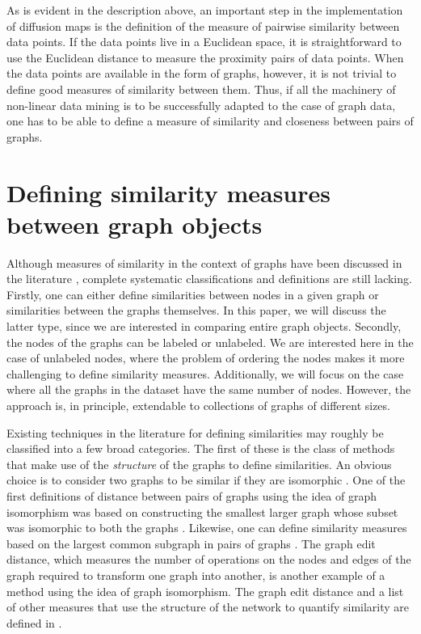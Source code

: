 As is evident in the description above, an important step in the
implementation of diffusion maps is the definition of the measure of
pairwise similarity between data points.
% 
If the data points live in a Euclidean space, it is straightforward to
use the Euclidean distance to measure the proximity pairs of data
points.
% 
When the data points are available in the form of graphs, however, it
is not trivial to define good measures of similarity between them.
% 
Thus, if all the machinery of non-linear data mining is to be
successfully adapted to the case of graph data, one has to be able to
define a measure of similarity and closeness between pairs of graphs.

\section{\label{sec:sim} Defining similarity measures between graph
  objects}

Although measures of similarity in the context of graphs have been
discussed in the literature \cite{koutra_algorithms_2011}, complete
systematic classifications and definitions are still lacking.
% 
Firstly, one can either define similarities between nodes in a given
graph or similarities between the graphs themselves.
% 
In this paper, we will discuss the latter type, since we are
interested in comparing entire graph objects.
% 
Secondly, the nodes of the graphs can be labeled or unlabeled.
% 
We are interested here in the case of unlabeled nodes, where the
problem of ordering the nodes makes it more challenging to define
similarity measures.
% 
Additionally, we will focus on the case where all the graphs in the
dataset have the same number of nodes.
% 
However, the approach is, in principle, extendable to collections of
graphs of different sizes.
% 

Existing techniques in the literature for defining similarities may
roughly be classified into a few broad categories.
% 
The first of these is the class of methods that make use of the {\em
  structure} of the graphs to define similarities.
% 
% 
An obvious choice is to consider two graphs to be similar if they are
isomorphic \cite{pelillo_replicator_1999}.
% 
One of the first definitions of distance between pairs of graphs using
the idea of graph isomorphism was based on constructing the smallest
larger graph whose subset was isomorphic to both the graphs
\cite{zelinka_certain_1975}.
% 
Likewise, one can define similarity measures based on the largest
common subgraph in pairs of graphs \cite{bunke_graph_1998,raymond_rascal:_2002}.
% 
The graph edit distance, which measures the number of operations on
the nodes and edges of the graph required to transform one graph into
another, is another example of a method using the idea of graph
isomorphism.
% 
The graph edit distance and a list of other measures that use the
structure of the network to quantify similarity are defined in
\cite{papadimitriou_web_2010}.


